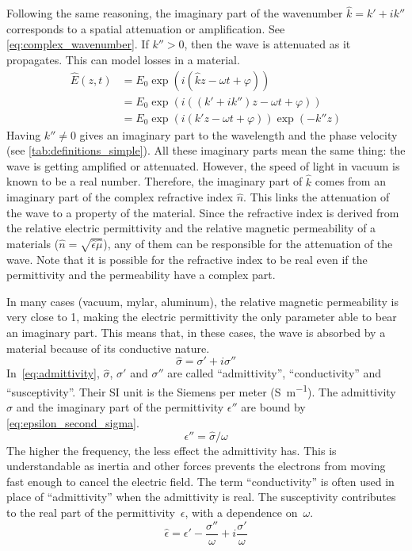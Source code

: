Following the same reasoning, the imaginary part of the wavenumber $\hat{k} = k' + i k''$ corresponds to a spatial attenuation or amplification.
See \cref{eq:complex_wavenumber}.
If $k''> 0$, then the wave is attenuated as it propagates.
This can model losses in a material.
\begin{subequations}
    \begin{align}
       \hat{E}(z, t) &=
       E_0 \exp(i(\hat{k}z - \omega t + \varphi))
       \\
       &=
       E_0 \exp(i((k' + i k'')z - \omega t + \varphi))
       \\
       &=
       E_0 \exp(i(k' z - \omega t + \varphi)) \exp(-k'' z)
    \end{align}
    \label{eq:complex_wavenumber}
\end{subequations}
Having $k'' \ne 0$ gives an imaginary part to the wavelength and the phase velocity
(see \cref{tab:definitions_simple}).
All these imaginary parts mean the same thing:
the wave is getting amplified or attenuated.
However, the speed of light in vacuum is known to be a real number.
Therefore, the imaginary part of $\hat{k}$ comes from an imaginary part of the complex refractive index $\hat{n}$.
This links the attenuation of the wave to a property of the material.
Since the refractive index is derived from the relative electric permittivity and the relative magnetic permeability of a materials
($\hat{n}=\sqrt{\hat{\epsilon}\hat{\mu}}$),
any of them can be responsible for the attenuation of the wave.
Note that it is possible for the refractive index to be real even if the permittivity and the permeability have a complex part.

In many cases (vacuum, mylar, aluminum), the relative magnetic permeability is very close to 1, making the electric permittivity the only parameter able to bear an imaginary part.
This means that, in these cases, the wave is absorbed by a material because of its conductive nature.
\begin{equation}
    \hat{\sigma} = \sigma' + i \sigma''
    \label{eq:admittivity}
\end{equation}
In~\cref{eq:admittivity}, $\hat{\sigma}$, $\sigma'$ and $\sigma''$
are called ``admittivity'', ``conductivity'' and ``susceptivity''.
Their SI unit is the Siemens per meter (\si{\siemens\per\meter}).
The admittivity $\hat{\sigma}$ and the imaginary part of the permittivity $\epsilon''$ are bound by \cref{eq:epsilon_second_sigma}.
\begin{equation}   
    \epsilon'' = \hat{\sigma} / \omega
    \label{eq:epsilon_second_sigma}
\end{equation}
The higher the frequency, the less effect the admittivity has.
This is understandable as inertia and other forces prevents the electrons from moving fast enough to cancel the electric field.
The term ``conductivity'' is often used in place of ``admittivity'' when the admittivity is real.
The susceptivity contributes to the real part of the permittivity~$\epsilon$, with a dependence on~$\omega$.
\begin{equation}
    \hat{\epsilon} = \epsilon' - \frac{\sigma''}{\omega} + i \frac{\sigma'}{\omega}
    \label{eq:epsilon_admittivity}
\end{equation}


